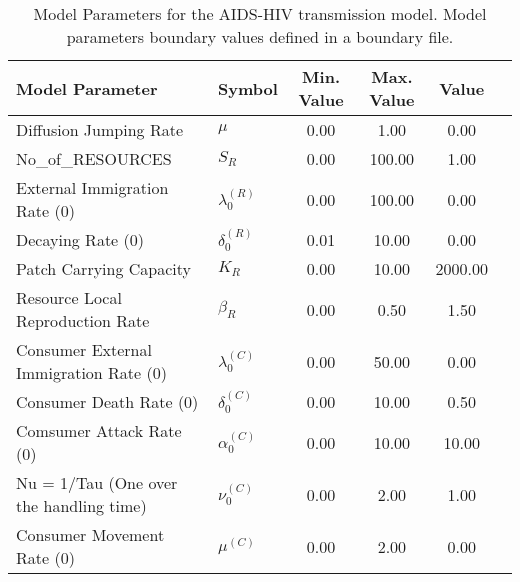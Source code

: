 \begin{table}
\centering
\begin{tabular}{p{5cm}lcccc}
{\bf Model Parameter} & {\bf Symbol} & {\bf Min. Value} & {\bf Max. Value} & {\bf Value}\\
\hline\hline
Diffusion Jumping Rate & $\mu$ & 0.00 & 1.00 & 0.00\\
No_of_RESOURCES & $S_R$ & 0.00 & 100.00 & 1.00\\
External Immigration Rate (0) & $\lambda^{(R)}_0$ & 0.00 & 100.00 & 0.00\\
Decaying Rate (0) & $\delta^{(R)}_0$ & 0.01 & 10.00 & 0.00\\
Patch Carrying Capacity & $K_R$ & 0.00 & 10.00 & 2000.00\\
Resource Local Reproduction Rate & $\beta_R$ & 0.00 & 0.50 & 1.50\\
Consumer External Immigration Rate (0) & $\lambda^{(C)}_0$ & 0.00 & 50.00 & 0.00\\
Consumer Death Rate (0) & $\delta^{(C)}_0$ & 0.00 & 10.00 & 0.50\\
Comsumer Attack Rate (0) & $\alpha^{(C)}_0$ & 0.00 & 10.00 & 10.00\\
Nu = 1/Tau (One over the handling time) & $\nu^{(C)}_0$ & 0.00 & 2.00 & 1.00\\
Consumer Movement Rate (0) & $\mu^{(C)}$ & 0.00 & 2.00 & 0.00\\
\hline\hline
\end{tabular}
\caption{Model Parameters for the AIDS-HIV transmission model. Model parameters boundary values defined in a boundary file.}
\end{table}
